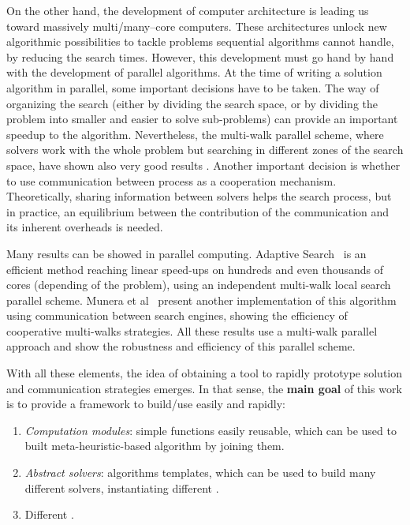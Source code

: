 On the other hand, the development of computer architecture is leading us toward massively multi/many--core computers. These architectures unlock new algorithmic possibilities to tackle problems sequential algorithms cannot handle, by reducing the search times.  However, this development must go hand by hand with the development of parallel algorithms. At the time of writing a solution algorithm in parallel, some important decisions have to be taken. The way of organizing the search (either by dividing the search space, or by dividing the problem into smaller and easier to solve sub-problems) can provide an important speedup to the algorithm. Nevertheless, the multi-walk parallel scheme, where solvers work with the whole problem but searching in different zones of the search space, have shown also very good results \cite{Arbelaez2014a, Caniou2011, Diaz2012a}. Another important decision is whether to use communication between process as a cooperation mechanism. Theoretically, sharing information between solvers helps the search process, but in practice, an equilibrium between the contribution of the communication and its inherent overheads is needed.

Many results can be showed in parallel computing. Adaptive Search~\cite{Diaz} is an efficient method reaching linear speed-ups on hundreds and even thousands of cores (depending of the problem), using an independent multi-walk local search parallel scheme. Munera et al~\cite{Munera} present another implementation of this algorithm using communication between search engines, showing the efficiency of cooperative multi-walks strategies. All these results use a multi-walk parallel approach and show the robustness and efficiency of this parallel scheme. %

With all these elements, the idea of obtaining a tool to rapidly prototype solution and communication strategies emerges. In that sense, the \textbf{main goal} of this work is to provide a framework to build/use easily and rapidly:
\begin{enumerate}
\item \textit{Computation modules}: simple functions easily reusable, which can be used to built meta-heuristic-based algorithm by joining them.
\item \textit{Abstract solvers}: algorithms templates, which can be used to build many different solvers, instantiating different \oms.
\item Different \comstrs.
\end{enumerate} 


